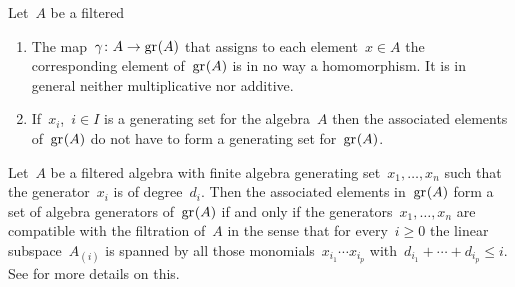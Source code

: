 \begin{warning}
  \label{generators of associated graded}
  Let~$A$ be a filtered~{\algebra{$\kf$}}
  \begin{enumerate}
    \item
      The map~$\gamma \colon A \to \gr(A)$ that assigns to each element~$x \in A$ the corresponding element of~$\gr(A)$ is in no way a homomorphism.
      It is in general neither multiplicative nor additive.
    \item
      \label{generators of associated graded part}
      If~$x_i$,~$i \in I$ is a generating set for the algebra~$A$ then the associated elements of~$\gr(A)$ do not have to form a generating set for~$\gr(A)$.
  \end{enumerate}
\end{warning}


\begin{remark}
  Let~$A$ be a filtered algebra with finite algebra generating set~$x_1, \dotsc, x_n$ such that the generator~$x_i$ is of degree~$d_i$.
  Then the associated elements in~$\gr(A)$ form a set of algebra generators of~$\gr(A)$ if and only if the generators~$x_1, \dotsc, x_n$ are compatible with the filtration of~$A$ in the sense that for every~$i \geq 0$ the linear subspace~$A_{(i)}$ is spanned by all those monomials~$x_{i_1} \dotsm x_{i_p}$ with~$d_{i_1} + \dotsb + d_{i_p} \leq i$.
  See \cite{associated_generated} for more details on this.
\end{remark}


